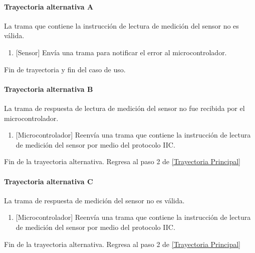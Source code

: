 \paragraph{Trayectoria alternativa A} \label{SUB-M-CU1.3:TA}
	La trama que contiene la instrucción de lectura de medición del sensor no es válida.
	\begin{enumerate}[label=A\arabic*.]
		\item {[Sensor]} Envía una trama para notificar el error al microcontrolador.  
	\end{enumerate}
	Fin de trayectoria y fin del caso de uso.

\paragraph{Trayectoria alternativa B} \label{SUB-M-CU1.3:TB}
	La trama de respuesta de lectura de medición del sensor no fue recibida por el microcontrolador.
	\begin{enumerate}[label=B\arabic*.]
		\item {[Microcontrolador]} Reenvía una trama que contiene la instrucción de lectura de medición del sensor por medio del protocolo IIC.  
	\end{enumerate}
	Fin de la trayectoria alternativa. Regresa al paso 2 de \hyperref[SUB-M-CU1.3:TP]{[Trayectoria Principal]}  
	
\paragraph{Trayectoria alternativa C} \label{SUB-M-CU1.3:TC}
	La trama de respuesta de medición del sensor no es válida.
	\begin{enumerate}[label=C\arabic*.]
		\item {[Microcontrolador]} Reenvía una trama que contiene la instrucción de lectura de medición del sensor por medio del protocolo IIC.  
	\end{enumerate}
	Fin de la trayectoria alternativa. Regresa al paso 2 de \hyperref[SUB-M-CU1.3:TP]{[Trayectoria Principal]} 